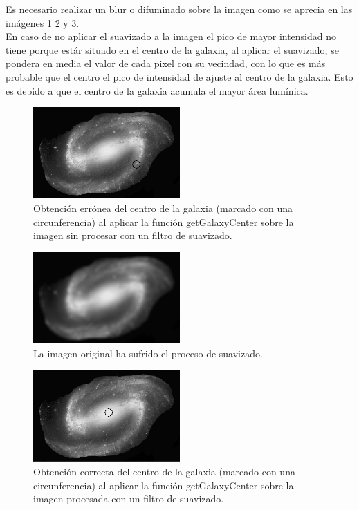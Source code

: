 	Es necesario realizar un blur o difuminado sobre la imagen como se aprecia en las imágenes \ref{fig:galaxiCenterFromImage_01_ERROR} \ref{fig:galaxiCenterFromImage_02_Blur} y \ref{fig:galaxiCenterFromImage_03_Correct}.
	\\
	En caso de no aplicar el suavizado a la imagen el pico de mayor intensidad no tiene porque estár situado en el centro de la galaxia, al aplicar el suavizado, se pondera en media el valor de cada pixel con su vecindad, con lo que es más probable que el centro el pico de intensidad de ajuste al centro de la galaxia. Esto es debido a que el centro de la galaxia acumula el mayor área lumínica.
	\begin{figure}[!htb]
		\centering
		\includegraphics[width=0.5\textwidth]{images/galaxiCenterFromImage_01_ERROR.png}
		\caption{\label{fig:galaxiCenterFromImage_01_ERROR}Obtención errónea del centro de la galaxia (marcado con una circunferencia) al aplicar la función {\scriptsize getGalaxyCenter} sobre la imagen sin procesar con un filtro de suavizado.}
	\end{figure}
	\begin{figure}[!htb]
		\centering
		\includegraphics[width=0.5\textwidth]{images/galaxiCenterFromImage_02_Blur.png}
		\caption{\label{fig:galaxiCenterFromImage_02_Blur}La imagen original ha sufrido el proceso de suavizado.}
	\end{figure}
	\begin{figure}[!htb]
		\centering
		\includegraphics[width=0.5\textwidth]{images/galaxiCenterFromImage_03_Correct.png}
		\caption{\label{fig:galaxiCenterFromImage_03_Correct}Obtención correcta del centro de la galaxia (marcado con una circunferencia) al aplicar la función {\scriptsize getGalaxyCenter} sobre la imagen procesada con un filtro de suavizado.}
	\end{figure}
